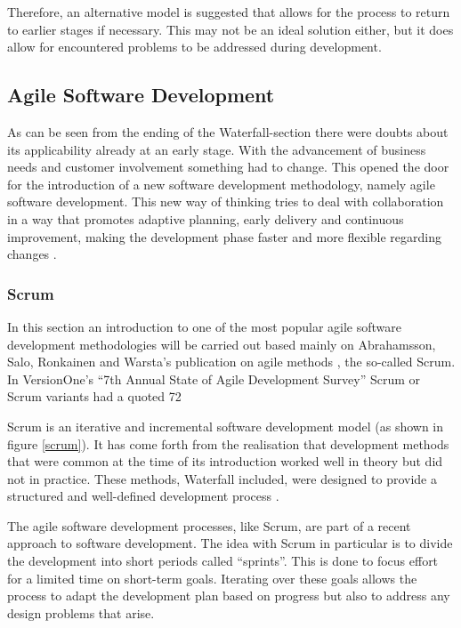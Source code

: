 Therefore, an alternative model is suggested that allows for the process to return to earlier stages if necessary. This may not be an ideal solution either, but it does allow for encountered problems to be addressed during development.

\subsection{Agile Software Development}

As can be seen from the ending of the Waterfall-section there were doubts about its applicability already at an early stage. With the advancement of business needs and customer involvement something had to change. This opened the door for the introduction of a new software development methodology, namely agile software development. This new way of thinking tries to deal with collaboration in a way that promotes adaptive planning, early delivery and continuous improvement, making the development phase faster and more flexible regarding changes \cite{abrahamsson2002}.

\subsubsection{Scrum}

In this section an introduction to one of the most popular agile software development methodologies will be carried out based mainly on Abrahamsson, Salo, Ronkainen and Warsta's publication on agile methods \cite{abrahamsson2002}, the so-called Scrum. In VersionOne's ``7th Annual State of Agile Development Survey'' Scrum or Scrum variants had a quoted 72%

Scrum is an iterative and incremental software development model (as shown in figure \ref{scrum}). It has come forth from the realisation that development methods that were common at the time of its introduction worked well in theory but did not in practice. These methods, Waterfall included, were designed to provide a structured and well-defined development process \cite{scrum}.

The agile software development processes, like Scrum, are part of a recent approach to software development. The idea with Scrum in particular is to divide the development into short periods called ``sprints''. This is done to focus effort for a limited time on short-term goals. Iterating over these goals allows the process to adapt the development plan based on progress but also to address any design problems that arise.

